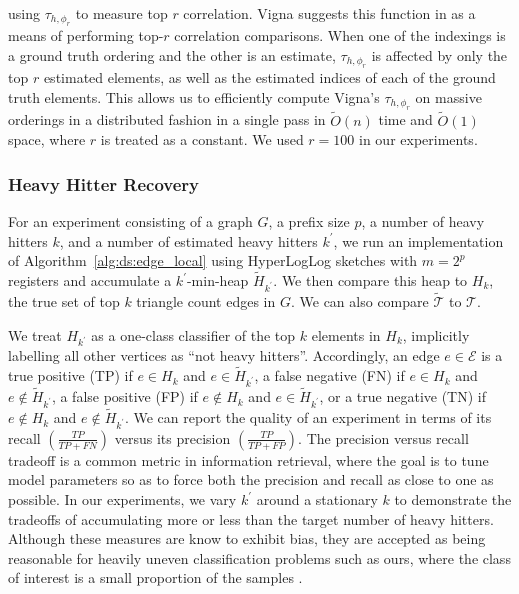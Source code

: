 \documentclass[10]{report}
\begin{document}
%
using $\tau_{h,\phi_r}$ to measure top $r$ correlation.
Vigna suggests this function in \cite{vigna2015weighted} as a means of performing top-$r$ correlation comparisons.
When one of the indexings is a ground truth ordering and the other is an estimate, $\tau_{h, \phi_r}$ is affected by only the top $r$ estimated elements, as well as the estimated indices of each of the ground truth elements.
This allows us to efficiently compute Vigna's $\tau_{h, \phi_r}$ on massive orderings in a distributed fashion in a single pass in $\widetilde{O}(n)$ time and $\widetilde{O}(1)$ space, where $r$ is treated as a constant.
We used $r = 100$ in our experiments.

\subsubsection{Heavy Hitter Recovery}

For an experiment consisting of a graph $G$, a prefix size $p$, a number of heavy hitters $k$, and a number of estimated heavy hitters $k^\prime$, we run an implementation of Algorithm~\ref{alg:ds:edge_local} using HyperLogLog sketches with $m=2^p$ registers and accumulate a $k^\prime$-min-heap $\widetilde{H}_{k^\prime}$. 
We then compare this heap to $H_k$, the true set of top $k$ triangle count edges in $G$.
We can also compare $\widetilde{\mathcal{T}}$ to $\mathcal{T}$.

We treat $H_{k^\prime}$ as a one-class classifier of the top $k$ elements in $H_k$, implicitly labelling all other vertices as ``not heavy hitters''.
Accordingly, an edge $e \in \mathcal{E}$ is a true positive (TP) if $e \in H_{k}$ and $e \in \widetilde{H}_{k^\prime}$, a false negative (FN) if $e \in H_{k}$ and $e \not\in \widetilde{H}_{k^\prime}$, a false positive (FP) if $e \not\in H_{k}$ and $e \in \widetilde{H}_{k^\prime}$, or a true negative (TN) if $e \not\in H_{k}$ and $e \not\in \widetilde{H}_{k^\prime}$.
We can report the quality of an experiment in terms of its recall $\left ( \frac{TP}{TP + FN} \right )$ versus its precision $\left ( \frac{TP}{TP + FP} \right )$.
The precision versus recall tradeoff is a common metric in information retrieval, where the goal is to tune model parameters so as to force both the precision and recall as close to one as possible.
In our experiments, we vary $k^\prime$ around a stationary $k$ to demonstrate the tradeoffs of accumulating more or less than the target number of heavy hitters.
Although these measures are know to exhibit bias, they are accepted as being reasonable for heavily uneven classification problems such as ours, where the class of interest is a small proportion of the samples \cite{boughorbel2017optimal}. 
\end{document}
